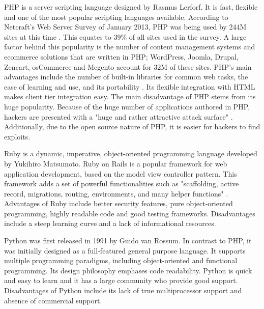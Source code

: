 \documentclass[authoryearcitations]{UoYCSproject}
\begin{document}
PHP is a server scripting language designed by Rasmus Lerforf. It is fast, flexible and one of the most popular scripting languages available. According to Netcraft's Web Server Survey of January 2013, PHP was being used by 244M sites at this time \citep{Ide2013}. This equates to 39\% of all sites used in the survey. A large factor behind this popularity is the number of content management systems and ecommerce solutions that are written in PHP; WordPress, Joomla, Drupal, Zencart, osCommerce and Megento account for 32M of these sites. PHP's main advantages include the number of built-in libraries for common web tasks, the ease of learning and use, and its portability \citep{Welling2005}. Its flexible integration with HTML makes client tier integration easy. The main disadvantage of PHP stems from its huge popularity. Because of the huge number of applications authored in PHP, hackers are presented with a "huge and rather attractive attack surface" \citep{Ide2013}. Additionally, due to the open source nature of PHP, it is easier for hackers to find exploits. 

Ruby is a dynamic, imperative, object-oriented programming language developed by Yukihiro Matsumoto. Ruby on Rails is a popular framework for web application development, based on the model view controller pattern. This framework adds a set of powerful functionalities such as "scaffolding, active record, migrations, routing, environments, and many helper functions" \citep{Jazayeri2007}. Advantages of Ruby include better security features, pure object-oriented programming, highly readable code and good testing frameworks. Disadvantages include a steep learning curve and a lack of informational resources.

Python was first released in 1991 by Guido van Rossum. In contrast to PHP, it was initially designed as a full-featured general purpose language. It supports multiple programming paradigms, including object-oriented and functional programming. Its design philosophy emphases code readability. Python is quick and easy to learn and it has a large community who provide good support. Disadvantages of Python include its lack of true multiprocessor support and absence of commercial support. 
\end{document}
